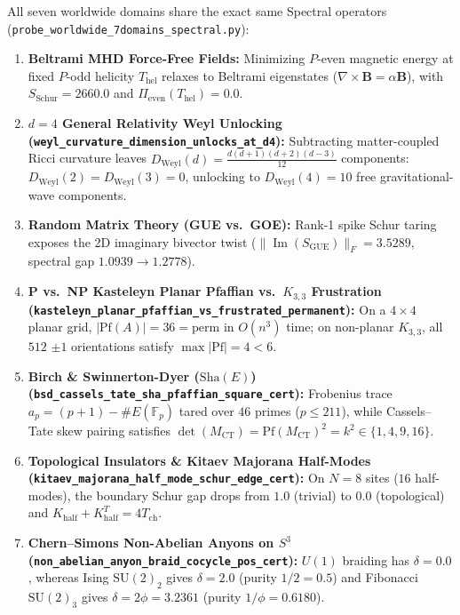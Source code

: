 \documentclass[11pt,a4paper]{article}
\providecommand{\Sha}{\mathrm{Sha}}
\begin{document}
All seven worldwide domains share the exact same Spectral operators (\texttt{probe\_worldwide\_7domains\_spectral.py}):
\begin{enumerate}
  \item \textbf{Beltrami MHD Force-Free Fields:} Minimizing $P$-even magnetic energy at fixed $P$-odd helicity $T_{\mathrm{hel}}$ relaxes to Beltrami eigenstates ($\nabla\times\mathbf{B} = \alpha\mathbf{B}$), with $S_{\mathrm{Schur}} = 2660.0$ and $\Pi_{\mathrm{even}}(T_{\mathrm{hel}}) = 0.0$.
  \item \textbf{$d=4$ General Relativity Weyl Unlocking (\texttt{weyl\_curvature\_dimension\_unlocks\_at\_d4}):} Subtracting matter-coupled Ricci curvature leaves $D_{\mathrm{Weyl}}(d) = \frac{d(d+1)(d+2)(d-3)}{12}$ components: $D_{\mathrm{Weyl}}(2) = D_{\mathrm{Weyl}}(3) = 0$, unlocking to $D_{\mathrm{Weyl}}(4) = 10$ free gravitational-wave components.
  \item \textbf{Random Matrix Theory (GUE vs.\ GOE):} Rank-1 spike Schur taring exposes the 2D imaginary bivector twist ($\|\operatorname{Im}(S_{\mathrm{GUE}})\|_F = 3.5289$, spectral gap $1.0939 \to 1.2778$).
  \item \textbf{P vs.\ NP Kasteleyn Planar Pfaffian vs.\ $K_{3,3}$ Frustration (\texttt{kasteleyn\_planar\_pfaffian\_vs\_frustrated\_permanent}):} On a $4\times 4$ planar grid, $|\mathrm{Pf}(A)| = 36 = \mathrm{perm}$ in $O(n^3)$ time; on non-planar $K_{3,3}$, all $512$ $\pm 1$ orientations satisfy $\max|\mathrm{Pf}| = 4 < 6$.
  \item \textbf{Birch \& Swinnerton-Dyer ($\Sha(E)$) (\texttt{bsd\_cassels\_tate\_sha\_pfaffian\_square\_cert}):} Frobenius trace $a_p = (p+1) - \#E(\mathbb{F}_p)$ tared over $46$ primes ($p \le 211$), while Cassels--Tate skew pairing satisfies $\det(M_{\mathrm{CT}}) = \mathrm{Pf}(M_{\mathrm{CT}})^2 = k^2 \in \{1, 4, 9, 16\}$.
  \item \textbf{Topological Insulators \& Kitaev Majorana Half-Modes (\texttt{kitaev\_majorana\_half\_mode\_schur\_edge\_cert}):} On $N=8$ sites ($16$ half-modes), the boundary Schur gap drops from $1.0$ (trivial) to $0.0$ (topological) and $K_{\mathrm{half}} + K_{\mathrm{half}}^T = 4 T_{\mathrm{ch}}$.
  \item \textbf{Chern--Simons Non-Abelian Anyons on $S^3$ (\texttt{non\_abelian\_anyon\_braid\_cocycle\_pos\_cert}):} $U(1)$ braiding has $\delta = 0.0$, whereas Ising $\mathrm{SU}(2)_2$ gives $\delta = 2.0$ (purity $1/2 = 0.5$) and Fibonacci $\mathrm{SU}(2)_3$ gives $\delta = 2\phi = 3.2361$ (purity $1/\phi = 0.6180$).
\end{enumerate}
\end{document}
